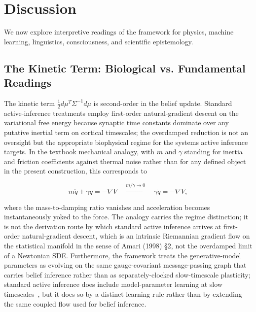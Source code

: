 \documentclass[11pt]{article}
\begin{document}
\section{Discussion}
\label{sec:implications}

We now explore interpretive readings of the framework for physics, machine learning, linguistics, consciousness, and scientific epistemology.

\subsection{The Kinetic Term: Biological vs. Fundamental Readings}

The kinetic term $\frac{1}{2}d\mu^T \Sigma^{-1} d\mu$ is second-order in the belief update. Standard active-inference treatments employ first-order natural-gradient descent on the variational free energy because synaptic time constants dominate over any putative inertial term on cortical timescales; the overdamped reduction is not an oversight but the appropriate biophysical regime for the systems active inference targets. In the textbook mechanical analogy, with $m$ and $\gamma$ standing for inertia and friction coefficients against thermal noise rather than for any defined object in the present construction, this corresponds to

\begin{equation}
m\ddot{q} + \gamma\dot{q} = -\nabla V \quad \xrightarrow{m/\gamma \to 0} \quad \gamma\dot{q} = -\nabla V,
\end{equation}

where the mass-to-damping ratio vanishes and acceleration becomes instantaneously yoked to the force. The analogy carries the regime distinction; it is not the derivation route by which standard active inference arrives at first-order natural-gradient descent, which is an intrinsic Riemannian gradient flow on the statistical manifold in the sense of Amari (1998) \S2, not the overdamped limit of a Newtonian SDE. Furthermore, the framework treats the generative-model parameters as evolving on the same gauge-covariant message-passing graph that carries belief inference rather than as separately-clocked slow-timescale plasticity; standard active inference does include model-parameter learning at slow timescales~\cite{Friston2010, Friston2017, Parr2022}, but it does so by a distinct learning rule rather than by extending the same coupled flow used for belief inference.
\end{document}

